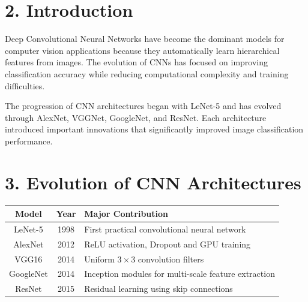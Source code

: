 \documentclass[11pt]{article}
\begin{document}

\section*{2. Introduction}

Deep Convolutional Neural Networks have become the dominant models for
computer vision applications because they automatically learn hierarchical
features from images. The evolution of CNNs has focused on improving
classification accuracy while reducing computational complexity and
training difficulties.

The progression of CNN architectures began with LeNet-5 and has evolved
through AlexNet, VGGNet, GoogleNet, and ResNet. Each architecture
introduced important innovations that significantly improved image
classification performance.


\section*{3. Evolution of CNN Architectures}

\begin{center}

\begin{tabular}{|c|c|p{7cm}|}

\hline

Model & Year & Major Contribution\\

\hline

LeNet-5 & 1998 &
First practical convolutional neural network\\

\hline

AlexNet & 2012 &
ReLU activation, Dropout and GPU training\\

\hline

VGG16 & 2014 &
Uniform $3\times3$ convolution filters\\

\hline

GoogleNet & 2014 &
Inception modules for multi-scale feature extraction\\

\hline

ResNet & 2015 &
Residual learning using skip connections\\

\hline

\end{tabular}

\end{center}
\end{document}
